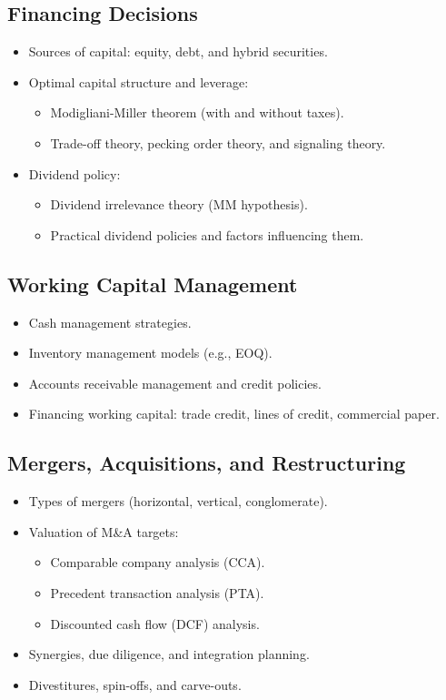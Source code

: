 \subsection{Financing Decisions}
\begin{itemize}
  \item Sources of capital: equity, debt, and hybrid securities.
  \item Optimal capital structure and leverage:
  \begin{itemize}
    \item Modigliani-Miller theorem (with and without taxes).
    \item Trade-off theory, pecking order theory, and signaling theory.
  \end{itemize}
  \item Dividend policy:
  \begin{itemize}
    \item Dividend irrelevance theory (MM hypothesis).
    \item Practical dividend policies and factors influencing them.
  \end{itemize}
\end{itemize}
        
\subsection{Working Capital Management}
\begin{itemize}
  \item Cash management strategies.
  \item Inventory management models (e.g., EOQ).
  \item Accounts receivable management and credit policies.
  \item Financing working capital: trade credit, lines of credit, commercial paper.
\end{itemize}

\subsection{Mergers, Acquisitions, and Restructuring}
\begin{itemize}
  \item Types of mergers (horizontal, vertical, conglomerate).
  \item Valuation of M\&A targets:
  \begin{itemize}
    \item Comparable company analysis (CCA).
    \item Precedent transaction analysis (PTA).
    \item Discounted cash flow (DCF) analysis.
  \end{itemize} 
  \item Synergies, due diligence, and integration planning.
  \item Divestitures, spin-offs, and carve-outs. 
\end{itemize}

